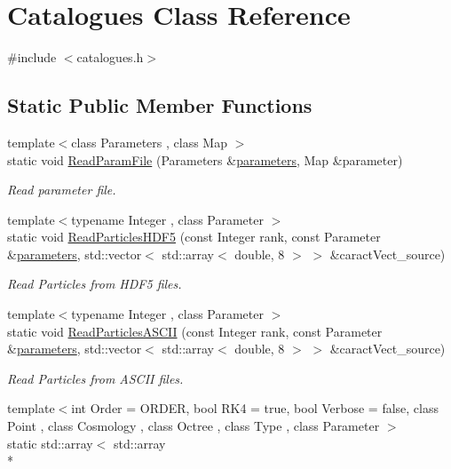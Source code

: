 \hypertarget{classCatalogues}{\section{Catalogues Class Reference}
\label{classCatalogues}
}


{\ttfamily \#include $<$catalogues.\-h$>$}

\subsection*{Static Public Member Functions}
\begin{DoxyCompactItemize}
\item 
{\footnotesize template$<$class Parameters , class Map $>$ }\\static void \hyperlink{classCatalogues_a6badfce6f6a1923394b53bdcdcaf5d02}{Read\-Param\-File} (Parameters \&\hyperlink{rays_8h_ae1bc8b0b8c8b9f8e4cc61a5cc7c4ce9e}{parameters}, Map \&parameter)
\begin{DoxyCompactList}\small\item\em Read parameter file. \end{DoxyCompactList}\item 
{\footnotesize template$<$typename Integer , class Parameter $>$ }\\static void \hyperlink{classCatalogues_a6d2964caadb435debe199808a09e493a}{Read\-Particles\-H\-D\-F5} (const Integer rank, const Parameter \&\hyperlink{rays_8h_ae1bc8b0b8c8b9f8e4cc61a5cc7c4ce9e}{parameters}, std\-::vector$<$ std\-::array$<$ double, 8 $>$ $>$ \&caract\-Vect\-\_\-source)
\begin{DoxyCompactList}\small\item\em Read Particles from H\-D\-F5 files. \end{DoxyCompactList}\item 
{\footnotesize template$<$typename Integer , class Parameter $>$ }\\static void \hyperlink{classCatalogues_a626e9b0a136c8f9aa5ef556ad84ba477}{Read\-Particles\-A\-S\-C\-I\-I} (const Integer rank, const Parameter \&\hyperlink{rays_8h_ae1bc8b0b8c8b9f8e4cc61a5cc7c4ce9e}{parameters}, std\-::vector$<$ std\-::array$<$ double, 8 $>$ $>$ \&caract\-Vect\-\_\-source)
\begin{DoxyCompactList}\small\item\em Read Particles from A\-S\-C\-I\-I files. \end{DoxyCompactList}\item 
{\footnotesize template$<$int Order = O\-R\-D\-E\-R, bool R\-K4 = true, bool Verbose = false, class Point , class Cosmology , class Octree , class Type , class Parameter $>$ }\\static std\-::array$<$ std\-::array\\*

\end{DoxyCompactItemize}
